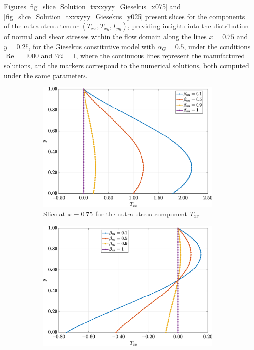 \documentclass[preprint, 12pt]{elsarticle}
\begin{document}
Figures \ref{fig_slice_Solution_txxxyyy_Giesekus_x075} and \ref{fig_slice_Solution_txxxyyy_Giesekus_y025} present slices for the components of the extra stress tensor $(T_{xx}, T_{xy}, T_{yy})$, providing insights into the distribution of normal and shear stresses within the flow domain along the lines $x=0.75$ and $y=0.25$, for the Giesekus constitutive model with $\alpha_G = 0.5$, under the conditions $\operatorname{Re}=1000$ and $Wi=1$, where the continuous lines represent the manufactured solutions, and the markers correspond to the numerical solutions, both computed under the same parameters.
\begin{figure}[H]
    \centering
    \begin{subfigure}[b]{.46\textwidth}
        \includegraphics[width=\textwidth]{Slice_x_Tog_Numerical_NormErr_2nd_Betann_1_Re_1000_Wi_1_epsilon_0_xi_0_alphaG_0.5_Dt_1e-06_at_0.05_tipsim_1_MMS_12_x0.75y0.75_Txx.eps}
        \caption{Slice at $x=0.75$ for the extra-stress component $T_{xx}$}
        \label{fig_slice_y_txx_2nd_Case1_giesekus_x075}
    \end{subfigure}
    \vspace{0.2cm}
    \qquad
    \begin{subfigure}[b]{.46\textwidth}
        \includegraphics[width=\textwidth]{Slice_x_Tog_Numerical_NormErr_2nd_Betann_1_Re_1000_Wi_1_epsilon_0_xi_0_alphaG_0.5_Dt_1e-06_at_0.05_tipsim_1_MMS_12_x0.75y0.75_Txy.eps}

\end{subfigure}
\end{figure}
\end{document}
